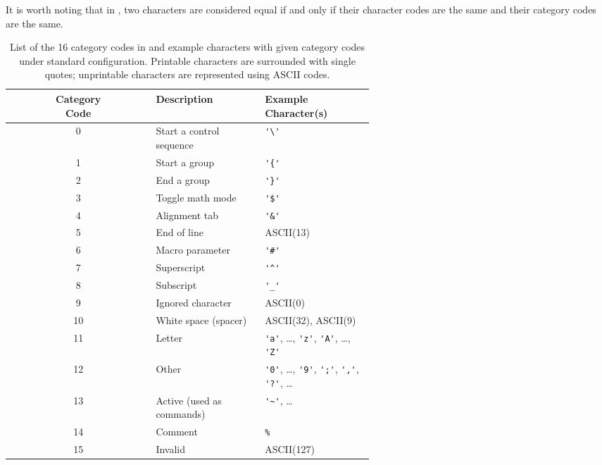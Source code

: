 \documentclass{ltugboat}
\begin{document}
\noindent 
It is worth noting that in \LT{}, two characters are considered equal if and only if their character codes are the same and their category codes are the same.


\begin{table}[tb]
  \centering
  \footnotesize
  \begin{tabular}{|c|>{\centering\arraybackslash}m{0.3\linewidth}|>{\centering\arraybackslash}m{0.3\linewidth}|}
    \hline
    \makecell{Category\\Code} & Description & \makecell{Example\\Character(s)} \\ \hline
    0 & Start a control sequence  & \verb|'\'| \\ \hline
    1 & Start a group & \verb|'{'| \\ \hline
    2 & End a group & \verb|'}'| \\ \hline
    3 & Toggle math mode & \verb|'$'| \\ \hline
    4 & Alignment tab & \verb|'&'| \\ \hline
    5 & End of line & ASCII(13) \\ \hline
    6 & Macro parameter & \verb|'#'| \\ \hline
    7 & Superscript & \verb|'^'| \\ \hline
    8 & Subscript & \verb|'_'| \\ \hline
    9 & Ignored character & ASCII(0) \\ \hline
    10 & White space (spacer) & ASCII(32), ASCII(9) \\ \hline
    11 & Letter & \verb|'a'|, \ldots, \verb|'z'|, \verb|'A'|, \ldots, \verb|'Z'|\\ \hline
    12 & Other & \verb|'0'|, \ldots, \verb|'9'|, \verb|';'|, \verb|','|, \verb|'?'|, \ldots\\ \hline
    13 & Active (used as commands) & \verb|'~'|, \ldots\\ \hline
    14 & Comment & \verb|%| \\ \hline
    15 & Invalid & ASCII(127) \\ \hline
  \end{tabular}
  \caption{List of the 16 category codes in \LT{} and example characters with given category codes under standard \LT{} configuration. Printable characters are surrounded with single quotes; unprintable characters are represented using ASCII codes.}
  \label{tab:cat-code}
\end{table}
\end{document}
